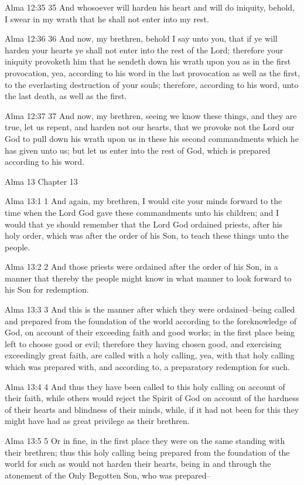 Alma 12:35
 35 And whosoever will harden his heart and will do iniquity,
behold, I swear in my wrath that he shall not enter into my rest.

Alma 12:36
 36 And now, my brethren, behold I say unto you, that if ye will
harden your hearts ye shall not enter into the rest of the Lord;
therefore your iniquity provoketh him that he sendeth down his
wrath upon you as in the first provocation, yea, according to his
word in the last provocation as well as the first, to the
everlasting destruction of your souls; therefore, according to
his word, unto the last death, as well as the first.

Alma 12:37
 37 And now, my brethren, seeing we know these things, and they
are true, let us repent, and harden not our hearts, that we
provoke not the Lord our God to pull down his wrath upon us in
these his second commandments which he has given unto us; but let
us enter into the rest of God, which is prepared according to his
word.

Alma 13
Chapter 13

Alma 13:1
 1 And again, my brethren, I would cite your minds forward to the
time when the Lord God gave these commandments unto his children;
and I would that ye should remember that the Lord God ordained
priests, after his holy order, which was after the order of his
Son, to teach these things unto the people.

Alma 13:2
 2 And those priests were ordained after the order of his Son, in
a manner that thereby the people might know in what manner to
look forward to his Son for redemption.

Alma 13:3
 3 And this is the manner after which they were ordained--being
called and prepared from the foundation of the world according to
the foreknowledge of God, on account of their exceeding faith and
good works; in the first place being left to choose good or evil;
therefore they having chosen good, and exercising exceedingly
great faith, are called with a holy calling, yea, with that holy
calling which was prepared with, and according to, a preparatory
redemption for such.

Alma 13:4
 4 And thus they have been called to this holy calling on account
of their faith, while others would reject the Spirit of God on
account of the hardness of their hearts and blindness of their
minds, while, if it had not been for this they might have had as
great privilege as their brethren.

Alma 13:5
 5 Or in fine, in the first place they were on the same standing
with their brethren; thus this holy calling being prepared from
the foundation of the world for such as would not harden their
hearts, being in and through the atonement of the Only Begotten
Son, who was prepared--

